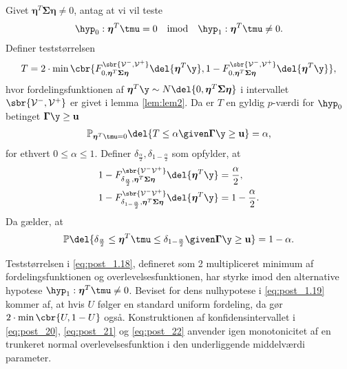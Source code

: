 \begin{lem} \label{lem:lem4}
Givet \(\boldsymbol{\eta}^T \boldsymbol{\Sigma} \boldsymbol{\eta} \neq 0\), antag at vi vil teste
\begin{align*}
\hyp_0: \boldsymbol{\eta}^T \tmu=0 \quad \text{imod} \quad \hyp_1: \boldsymbol{\eta}^T \tmu \neq 0.
\end{align*}
Definer teststørrelsen
\begin{align}
T=2 \cdot \min\cbr{F_{0, \boldsymbol{\eta}^T \boldsymbol{\Sigma} \boldsymbol{\eta}}^{\sbr{\mathcal{V}^-, \mathcal{V}^+}} \del{\boldsymbol{\eta}^T \y}, 1 - F_{0, \boldsymbol{\eta}^T \boldsymbol{\Sigma} \boldsymbol{\eta}}^{\sbr{\mathcal{V}^-, \mathcal{V}^+}} \del{\boldsymbol{\eta}^T \y}}, \label{eq:post_1.18}
\end{align}
hvor fordelingsfunktionen af \(\boldsymbol{\eta}^T \y \sim N \del{0,  \boldsymbol{\eta}^T \boldsymbol{\Sigma} \boldsymbol{\eta}}\) i intervallet \(\sbr{\mathcal{V}^-, \mathcal{V}^+}\) er givet i lemma \ref{lem:lem2}.
Da er \(T\) en gyldig \(p\)-værdi for \(\hyp_0\) betinget \(\boldsymbol{\Gamma} \y \geq \mathbf{u}\)
\begin{align}
\mathbb{P}_{\boldsymbol{\eta}^T \tmu=0} \del{T \leq \alpha \given \boldsymbol{\Gamma} \y \geq \mathbf{u}} = \alpha, \label{eq:post_1.19}
\end{align}
for ethvert \(0 \leq \alpha \leq 1\). 
Definer \(\delta_{\frac{\alpha}{2}}, \delta_{1-\frac{\alpha}{2}}\) som opfylder, at
\begin{align}
1-F_{\delta_{\frac{\alpha}{2}}, \boldsymbol{\eta}^T \boldsymbol{\Sigma} \boldsymbol{\eta}}^{\sbr{\mathcal{V}^- \mathcal{V}^+}} \del{\boldsymbol{\eta}^T \y} &= \frac{\alpha}{2}, \label{eq:post_20} \\
1-F_{\delta_{1-\frac{\alpha}{2}}, \boldsymbol{\eta}^T \boldsymbol{\Sigma} \boldsymbol{\eta} }^{\sbr{\mathcal{V}^- \mathcal{V}^+}} \del{\boldsymbol{\eta}^T \y} &= 1-\frac{\alpha}{2}. \label{eq:post_21}
\end{align}
Da gælder, at
\begin{align}
\mathbb{P} \del{\delta_{\frac{\alpha}{2}} \leq  \boldsymbol{\eta}^T \tmu \leq \delta_{1-\frac{\alpha}{2}} \given \boldsymbol{\Gamma} \y \geq \mathbf{u}} = 1- \alpha. \label{eq:post_22}
\end{align}
\end{lem}
%
Teststørrelsen i \eqref{eq:post_1.18}, defineret som 2 multipliceret minimum af fordelingsfunktionen  og overlevelsesfunktionen, har styrke imod den alternative hypotese \(\hyp_1: \boldsymbol{\eta}^T \tmu \neq 0\).
Beviset for dens nulhypotese i \eqref{eq:post_1.19} kommer af, at hvis \(U\) følger en standard uniform fordeling, da gør \(2 \cdot \min \cbr{U,1-U}\) også.
Konstruktionen af konfidensintervallet i \eqref{eq:post_20}, \eqref{eq:post_21} og \eqref{eq:post_22} anvender igen monotonicitet af en trunkeret normal overlevelsesfunktion i den underliggende middelværdi parameter.

